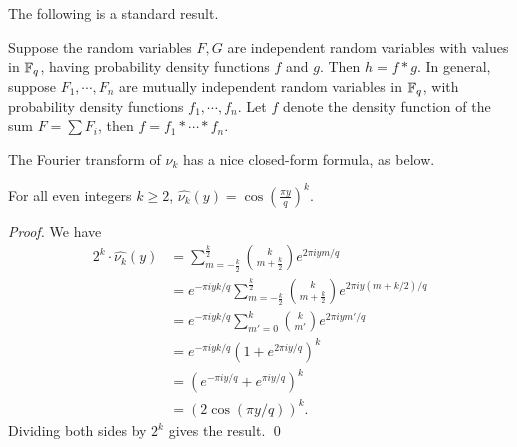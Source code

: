 \documentclass[envcountsame]{llncs}
\begin{document}
The following is a standard result.

\begin{lemma}
Suppose the random variables $F,G$ are independent random variables with values in $\mathbb{F}_q$, having probability density functions $f$ and $g$.  Then $h =  f \ast g$.
In general, suppose $F_1, \cdots, F_n$ are mutually independent random variables in $\mathbb{F}_q$, with probability density functions $f_1, \cdots, f_n$. Let $f$ denote the density function of the sum $F = \sum F_i$, then $f = f_1 \ast \cdots \ast f_n$.
\end{lemma}


The Fourier transform of $\nu_k$ has a nice closed-form formula, as below.
\begin{lemma}
\label{lem: transform1}
For all even integers $k \geq 2$, $\widehat{\nu_k}(y)  = \cos \left(\frac{\pi y}{q}\right)^k.$
\end{lemma}

\begin{proof}  We have
\begin{align*}
2^k \cdot \widehat{\nu_k}(y) &= \sum_{m = -\frac{k}{2}}^{\frac{k}{2}} {k \choose m+\frac{k}{2}} e^{2\pi i ym/q}  \\
&= e^{-\pi i yk/q}\sum_{m = -\frac{k}{2}}^{\frac{k}{2}} {k \choose m+\frac{k}{2}} e^{2\pi i y(m+k/2)/q} \\
&= e^{-\pi i yk/q} \sum_{m' = 0}^{k} {k \choose m'} e^{2\pi i ym'/q} \\
& =  e^{-\pi i yk/q} (1+ e^{2 \pi i y/q})^k \\
& = (e^{-\pi i y/q} + e^{\pi i y/q})^k  \\
& = (2 \cos(\pi y/q))^k.
\end{align*}
Dividing both sides by $2^k$ gives the result.
\qed \end{proof}
\end{document}

